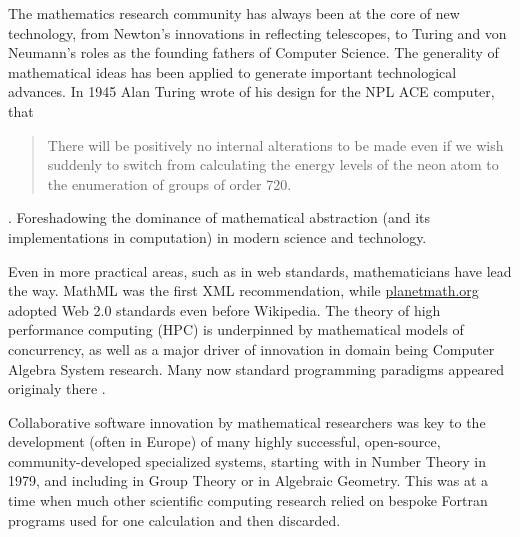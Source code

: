 
The mathematics research community has always been at the core of new
technology, from Newton's innovations in reflecting telescopes, to
Turing and von Neumann's roles as the founding fathers of Computer
Science. The generality of mathematical ideas has been applied to
generate important technological advances.  In 1945 Alan Turing wrote
of his design for the NPL ACE computer, that
\begin{quote}
  There will be positively no internal alterations to be
  made even if we wish suddenly to switch from calculating the energy
  levels of the neon atom to the enumeration of groups of order
  720.
\end{quote}.  
Foreshadowing the dominance of mathematical abstraction (and its
implementations in computation) in modern science and technology.

Even in more practical areas, such as in web standards, mathematicians
have lead the way. MathML was the first XML recommendation, while
\url{planetmath.org} adopted Web 2.0 standards even before
Wikipedia. The theory of high performance computing (HPC) is underpinned by mathematical models of concurrency, as well as a major driver of innovation in domain being Computer Algebra System research. Many now standard
programming paradigms appeared originaly there .



Collaborative software innovation by mathematical researchers was key
to the development (often in Europe) of many highly successful,
open-source, community-developed specialized systems, starting with
\PariGP in Number Theory in 1979, and including \GAP in Group Theory
or \Singular in Algebraic Geometry. This was at a time when much other
scientific computing research relied on bespoke Fortran programs used
for one calculation and then discarded.



